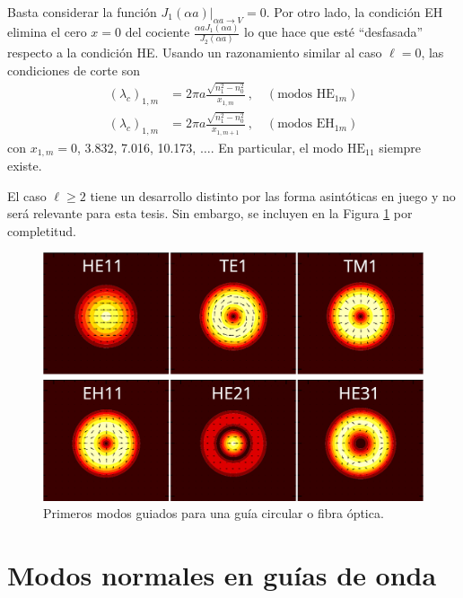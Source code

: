 Basta considerar la función $J_1(\alpha a)|_{\alpha a \to V} = 0$. Por otro lado, la condición EH elimina el cero $x=0$ del cociente $\frac{\alpha aJ_1(\alpha a)}{J_2(\alpha a)}$ lo que hace que esté ``desfasada'' respecto a la condición HE. Usando un razonamiento similar al caso $\ell =0$, las condiciones de corte son
\begin{align*}
	(\lambda_c)_{1,m} &= 2\pi a \frac{\sqrt{n_1^2 - n_0^2}}{x_{1,m}} \ ,  \quad \left(\text{modos HE}_{1m}\right)
	\\
	(\lambda_c)_{1,m} &= 2\pi a \frac{\sqrt{n_1^2 - n_0^2}}{x_{1,m+1}} \ , \quad \left(\text{modos EH}_{1m}\right)
\end{align*}
con $x_{1,m}=0$, 3.832,  7.016, 10.173, $\dots$.
En particular, el modo $\text{HE}_{11}$ siempre existe.

El caso $\ell \ge 2$ tiene un desarrollo distinto por las forma asintóticas en juego y no será relevante para esta tesis. Sin embargo, se incluyen en la Figura \ref{fig:vortices} por completitud.
\begin{figure}[H]
	\includegraphics[width=\linewidth]{media/OAM_analitic}
		\caption{Primeros modos guiados para una guía circular o fibra óptica. \label{fig:vortices}}
\end{figure}

\section{Modos normales en guías de onda}

